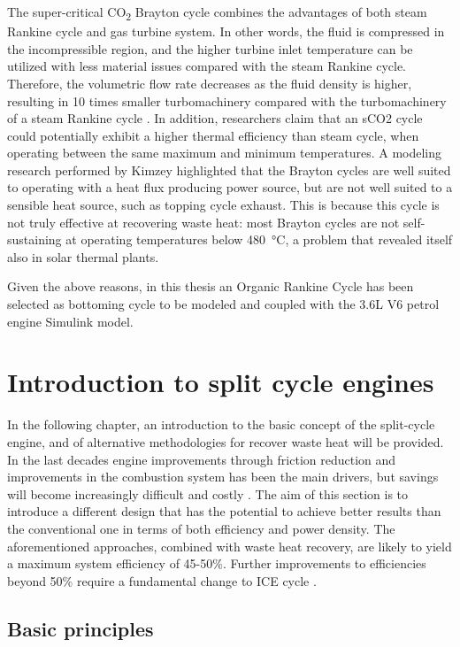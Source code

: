 The super-critical CO\textsubscript{2} Brayton cycle combines the advantages of both steam Rankine cycle and gas turbine system. In other words, the fluid is compressed in the incompressible region, and the higher turbine inlet temperature can be utilized with less material issues compared with the steam Rankine cycle. Therefore, the volumetric flow rate decreases as the fluid density is higher, resulting in 10 times smaller turbomachinery compared with the turbomachinery of a steam Rankine cycle \cite{Ahn2015}. In addition, researchers claim \cite{Kimzey2012} that an sCO2 cycle could potentially exhibit a higher thermal efficiency than steam cycle, when operating between the same maximum and minimum temperatures. A modeling research performed by Kimzey \cite{Kimzey2012} highlighted that the Brayton cycles are well suited to operating with a heat flux producing power source, but are not well suited to a sensible heat source, such as topping cycle exhaust. This is because this cycle is not truly effective at recovering waste heat: most Brayton cycles are not self-sustaining at operating temperatures below \SI{480}{\celsius}, a problem that revealed itself also in solar thermal plants. 

Given the above reasons, in this thesis an Organic Rankine Cycle has been selected as bottoming cycle to be modeled and coupled with the 3.6L V6 petrol engine Simulink model.

\section{Introduction to split cycle engines}

In the following chapter, an introduction to the basic concept of the split-cycle engine, and of alternative methodologies for recover waste heat will be provided. In the last decades engine improvements through friction reduction and improvements in the combustion system has been the main drivers, but savings will become increasingly difficult and costly \cite{Stanton2013}. The aim of this section is to introduce a different design that has the potential to achieve better results than the conventional one in terms of both efficiency and power density. The aforementioned approaches, combined with waste heat recovery, are likely to yield a maximum system efficiency of 45-50\%. Further improvements to efficiencies beyond 50\% require a fundamental change to ICE cycle \cite{Dong2015}.

\subsection{Basic principles}

